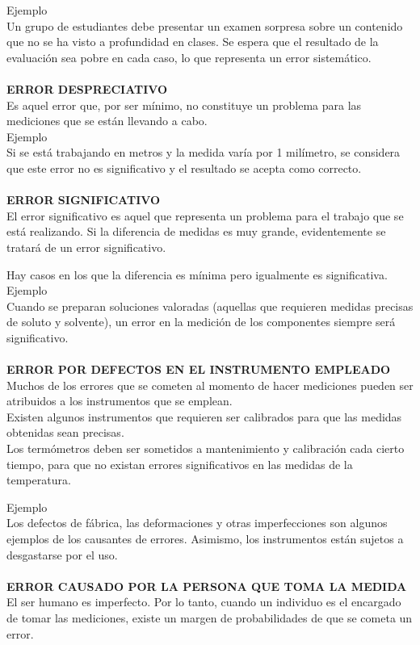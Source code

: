 \documentclass{article}
\begin{document}
\begin{multicols}{2}
Ejemplo
\\
Un grupo de estudiantes debe presentar un examen sorpresa sobre un contenido que no se ha visto a profundidad en clases.
Se espera que el resultado de la evaluación sea pobre en cada caso, lo que representa un error sistemático.
\\
\\
\textbf{ERROR DESPRECIATIVO}
\\
Es aquel error que, por ser mínimo, no constituye un problema para las mediciones que se están llevando a cabo.
\\
Ejemplo
\\
Si se está trabajando en metros y la medida varía por 1 milímetro, se considera que este error no es significativo y el resultado se acepta como correcto.
\\
\\
\textbf{ERROR SIGNIFICATIVO}
\\
El error significativo es aquel que representa un problema para el trabajo que se está realizando. Si la diferencia de medidas es muy grande, evidentemente se tratará de un error significativo.

Hay casos en los que la diferencia es mínima pero igualmente es significativa.
\\
Ejemplo
\\
Cuando se preparan soluciones valoradas (aquellas que requieren medidas precisas de soluto y solvente), un error en la medición de los componentes siempre será significativo.
\\
\\
\textbf{ERROR POR DEFECTOS EN EL INSTRUMENTO EMPLEADO}
\\
Muchos de los errores que se cometen al momento de hacer mediciones pueden ser atribuidos a los instrumentos que se emplean.
\\
Existen algunos instrumentos que requieren ser calibrados para que las medidas obtenidas sean precisas.
\\
Los termómetros deben ser sometidos a mantenimiento y calibración cada cierto tiempo, para que no existan errores significativos en las medidas de la temperatura.

Ejemplo
\\
Los defectos de fábrica, las deformaciones y otras imperfecciones son algunos ejemplos de los causantes de errores. Asimismo, los instrumentos están sujetos a desgastarse por el uso.
\\
\\
\textbf{ERROR CAUSADO POR LA PERSONA QUE TOMA LA MEDIDA}
\\
El ser humano es imperfecto. Por lo tanto, cuando un individuo es el encargado de tomar las mediciones, existe un margen de probabilidades de que se cometa un error.


\end{multicols}
\end{document}
